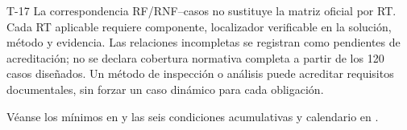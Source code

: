 \begin{formulario}{T-17}
La correspondencia RF/RNF--casos no sustituye la matriz oficial por RT. Cada RT aplicable requiere componente, localizador verificable en la solución, método y evidencia. Las relaciones incompletas se registran como pendientes de acreditación; no se declara cobertura normativa completa a partir de los 120 casos diseñados. Un método de inspección o análisis puede acreditar requisitos documentales, sin forzar un caso dinámico para cada obligación.

Véanse los mínimos en  y las seis condiciones acumulativas y calendario en .

\end{formulario}

